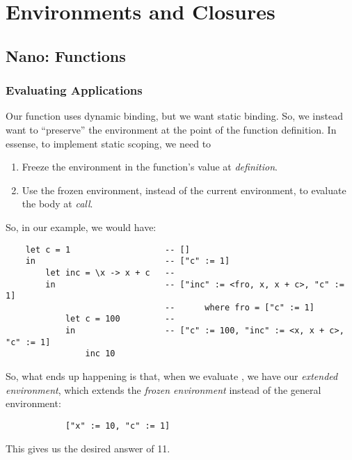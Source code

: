 \documentclass[letterpaper]{article}
\begin{document}
\section{Environments and Closures}
\subsection{Nano: Functions}
\subsubsection{Evaluating Applications}
Our  function uses dynamic binding, but we want static binding. So, we instead want to ``preserve'' the environment at the point of the function definition. In essense, to implement static scoping, we need to 
\begin{enumerate}
    \item Freeze the environment in the function's value at \emph{definition}.
    \item Use the frozen environment, instead of the current environment, to evaluate the body at \emph{call}.
\end{enumerate}
So, in our example, we would have: 
\begin{verbatim}
    let c = 1                   -- []
    in                          -- ["c" := 1]
        let inc = \x -> x + c   -- 
        in                      -- ["inc" := <fro, x, x + c>, "c" := 1]
                                --      where fro = ["c" := 1]
            let c = 100         -- 
            in                  -- ["c" := 100, "inc" := <x, x + c>, "c" := 1]
                inc 10 \end{verbatim}
        So, what ends up happening is that, when we evaluate , we have our \emph{extended environment}, which extends the \emph{frozen environment} instead of the general environment:
        \begin{verbatim}
            ["x" := 10, "c" := 1]\end{verbatim}
This gives us the desired answer of 11. 
\end{document}
